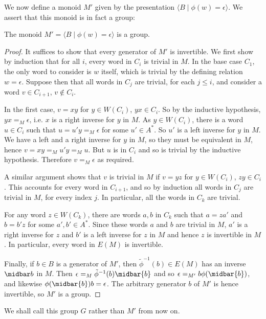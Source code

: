 \documentclass[11pt,libertine,widepage,nosubthm]{lmaths}
\begin{document}
We now define a monoid $M'$ given by the presentation $\langle B \mid \phi(w) = \epsilon \rangle$. We assert that this monoid is in fact a group:

\begin{lemma}
	The monoid $M' = \langle B \mid \phi(w) = \epsilon\rangle$ is a group.
\end{lemma}
\begin{proof}
	It suffices to show that every generator of $M'$ is invertible. We first show by induction that for all $i$, every word in $C_i$ is trivial in $M$. In the base case $C_1$, the only word to consider is $w$ itself, which is trivial by the defining relation $w = \epsilon$. Suppose then that all words in $C_j$ are trivial, for each $j \le i$, and consider a word $v \in C_{i+1}$, $v \not\in C_i$.

	In the first case, $v = xy$ for $y \in W(C_i)$, $yx \in C_i$. So by the inductive hypothesis, $yx =_M \epsilon$, i.e. $x$ is a right inverse for $y$ in $M$. As $y \in W(C_i)$, there is a word $u \in C_i$ such that $u = u'y =_M \epsilon$ for some $u' \in A^*$. So $u'$ is a left inverse for $y$ in $M$. We have a left and a right inverse for $y$ in $M$, so they must be equivalent in $M$, hence $v = xy =_M u'y =_M u$. But $u$ is in $C_i$ and so is trivial by the inductive hypothesis. Therefore $v =_M \epsilon$ as required.

	A similar argument shows that $v$ is trivial in $M$ if $v = yz$ for $y \in W(C_i)$, $zy \in C_i$. This accounts for every word in $C_{i+1}$, and so by induction all words in $C_j$ are trivial in $M$, for every index $j$. In particular, all the words in $C_k$ are trivial.

	For any word $z \in W(C_k)$, there are words $a, b$ in $C_k$ such that $a = za'$ and $b = b'z$ for some $a', b' \in A^*$. Since these words $a$ and $b$ are trivial in $M$, $a'$ is a right inverse for $z$ and $b'$ is a left inverse for $z$ in $M$ and hence $z$ is invertible in $M$. In particular, every word in $E(M)$ is invertible.

	Finally, if $b \in B$ is a generator of $M'$, then $\tilde\phi^{-1}(b) \in E(M)$ has an inverse $\midbar b$ in $M$. Then $\epsilon =_M \tilde\phi^{-1}(b) \midbar{b}$ and so $\epsilon =_{M'} b\phi(\midbar{b})$, and likewise $\phi(\midbar{b})b = \epsilon$. The arbitrary generator $b$ of $M'$ is hence invertible, so $M'$ is a group.
\end{proof}

We shall call this group $G$ rather than $M'$ from now on.
\end{document}
